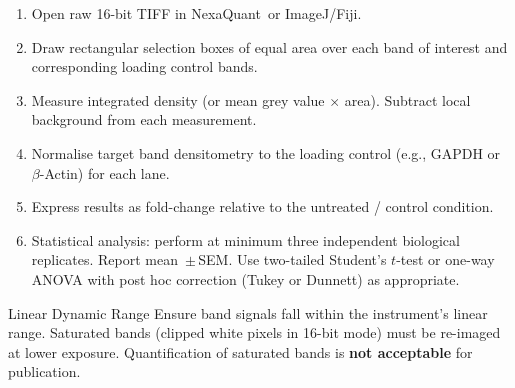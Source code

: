 \begin{enumerate}
  \item Open raw 16-bit TIFF in NexaQuant\texttrademark~or ImageJ/Fiji.
  \item Draw rectangular selection boxes of equal area over each band of interest
        and corresponding loading control bands.
  \item Measure integrated density (or mean grey value $\times$ area). Subtract
        local background from each measurement.
  \item Normalise target band densitometry to the loading control (e.g., GAPDH
        or \ensuremath{\beta}-Actin) for each lane.
  \item Express results as fold-change relative to the untreated / control condition.
  \item Statistical analysis: perform at minimum three independent biological
        replicates. Report mean~$\pm$\,SEM. Use two-tailed Student's $t$-test or
        one-way ANOVA with post hoc correction (Tukey or Dunnett) as appropriate.
\end{enumerate}

\par
\begin{notebox}{Linear Dynamic Range}
Ensure band signals fall within the instrument's linear range. Saturated bands
(clipped white pixels in 16-bit mode) must be re-imaged at lower exposure.
Quantification of saturated bands is \textbf{not acceptable} for publication.
\end{notebox}

\par\vspace{4pt}

